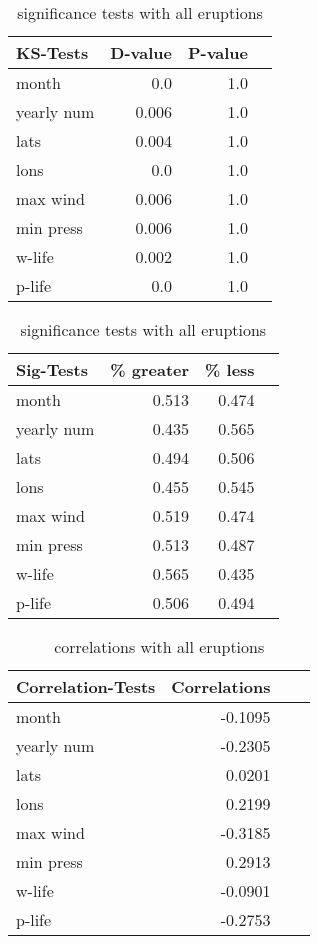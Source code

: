 \documentclass[smallextended]{svjour3}       %
\begin{document}
\begin{table}[!tbp]
\centering
\begin{minipage}[b]{0.45\textwidth}
\begin{tabular}{lrrr}
\toprule
             KS-Tests &     D-value &      P-value\\
\midrule

month & 0.0 & 1.0 \\
yearly num & 0.006 & 1.0 \\
lats & 0.004 & 1.0 \\
lons & 0.0 & 1.0 \\
max wind & 0.006 & 1.0 \\
min press & 0.006 & 1.0 \\
w-life & 0.002 & 1.0 \\
p-life & 0.0 & 1.0 \\

\bottomrule
\end{tabular}
\caption{ks-tests with all eruptions}
\label{ks_all}
\end{minipage}
\hfill
\begin{minipage}[b]{0.45\textwidth}
\begin{tabular}{lrrr}
\toprule
             Sig-Tests & \% greater &  \% less \\
\midrule

month & 0.513 & 0.474 \\
yearly num & 0.435 & 0.565 \\
lats & 0.494 & 0.506 \\
lons & 0.455 & 0.545 \\
max wind & 0.519 & 0.474 \\
min press & 0.513 & 0.487 \\
w-life & 0.565 & 0.435 \\
p-life & 0.506 & 0.494 \\

\bottomrule
\end{tabular}
\caption{significance tests with all eruptions}
\label{sig_all}
\end{minipage}
\end{table}

\begin{table}[!tbp]
\centering
\begin{tabular}{lrrr}
\toprule
             Correlation-Tests &     Correlations \\
\midrule

month & -0.1095 \\
yearly num & -0.2305 \\
lats & 0.0201 \\
lons & 0.2199 \\
max wind & -0.3185 \\
min press & 0.2913 \\
w-life & -0.0901 \\
p-life & -0.2753 \\

\bottomrule
\end{tabular}
\caption{correlations with all eruptions}
\label{corr_all}
\end{table}
\end{document}
